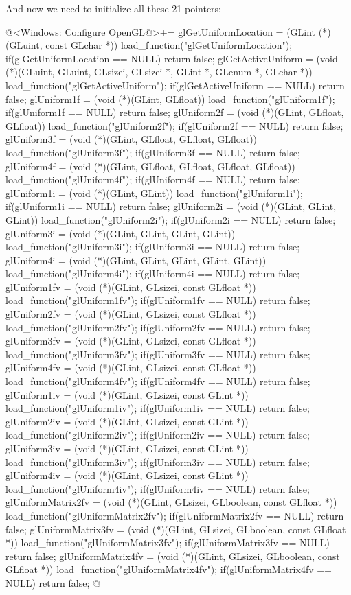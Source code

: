 And now we need to initialize all these 21 pointers:

\iniciocodigo
@<Windows: Configure OpenGL@>+=
glGetUniformLocation = (GLint (*)(GLuint, const GLchar *))
                            load_function("glGetUniformLocation");
if(glGetUniformLocation == NULL) return false;
glGetActiveUniform = (void (*)(GLuint, GLuint, GLsizei, GLsizei *, GLint *,
                      GLenum *, GLchar *)) load_function("glGetActiveUniform");
if(glGetActiveUniform == NULL) return false;
glUniform1f = (void (*)(GLint, GLfloat)) load_function("glUniform1f");
if(glUniform1f == NULL) return false;
glUniform2f = (void (*)(GLint, GLfloat, GLfloat)) load_function("glUniform2f");
if(glUniform2f == NULL) return false;
glUniform3f = (void (*)(GLint, GLfloat, GLfloat, GLfloat))
                        load_function("glUniform3f");
if(glUniform3f == NULL) return false;
glUniform4f = (void (*)(GLint, GLfloat, GLfloat, GLfloat, GLfloat))
                        load_function("glUniform4f");
if(glUniform4f == NULL) return false;
glUniform1i = (void (*)(GLint, GLint)) load_function("glUniform1i");
if(glUniform1i == NULL) return false;
glUniform2i = (void (*)(GLint, GLint, GLint)) load_function("glUniform2i");
if(glUniform2i == NULL) return false;
glUniform3i = (void (*)(GLint, GLint, GLint, GLint)) load_function("glUniform3i");
if(glUniform3i == NULL) return false;
glUniform4i = (void (*)(GLint, GLint, GLint, GLint, GLint))
                 load_function("glUniform4i");
if(glUniform4i == NULL) return false;
glUniform1fv = (void (*)(GLint, GLsizei, const GLfloat *))
                 load_function("glUniform1fv");
if(glUniform1fv == NULL) return false;
glUniform2fv = (void (*)(GLint, GLsizei, const GLfloat *))
                 load_function("glUniform2fv");
if(glUniform2fv == NULL) return false;
glUniform3fv = (void (*)(GLint, GLsizei, const GLfloat *))
                 load_function("glUniform3fv");
if(glUniform3fv == NULL) return false;
glUniform4fv = (void (*)(GLint, GLsizei, const GLfloat *))
                 load_function("glUniform4fv");
if(glUniform4fv == NULL) return false;
glUniform1iv = (void (*)(GLint, GLsizei, const GLint *))
                 load_function("glUniform1iv");
if(glUniform1iv == NULL) return false;
glUniform2iv = (void (*)(GLint, GLsizei, const GLint *))
                 load_function("glUniform2iv");
if(glUniform2iv == NULL) return false;
glUniform3iv = (void (*)(GLint, GLsizei, const GLint *))
                 load_function("glUniform3iv");
if(glUniform3iv == NULL) return false;
glUniform4iv = (void (*)(GLint, GLsizei, const GLint *))
                 load_function("glUniform4iv");
if(glUniform4iv == NULL) return false;
glUniformMatrix2fv = (void (*)(GLint, GLsizei, GLboolean, const GLfloat *))
                      load_function("glUniformMatrix2fv");
if(glUniformMatrix2fv == NULL) return false;
glUniformMatrix3fv = (void (*)(GLint, GLsizei, GLboolean, const GLfloat *))
                      load_function("glUniformMatrix3fv");
if(glUniformMatrix3fv == NULL) return false;
glUniformMatrix4fv = (void (*)(GLint, GLsizei, GLboolean, const GLfloat *))
                      load_function("glUniformMatrix4fv");
if(glUniformMatrix4fv == NULL) return false;
@
\fimcodigo

